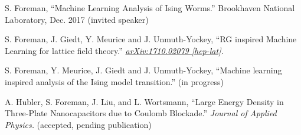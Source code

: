 

\begin{cvparagraph}

    \vspace{2ex}
    \begin{cvitems}
    \item {S. Foreman, ``Machine Learning Analysis of Ising Worms.'' Brookhaven
        National Laboratory, Dec. 2017 (invited speaker)}
    \item {S. Foreman, J. Giedt, Y. Meurice and J. Unmuth-Yockey, ``RG inspired
            Machine Learning for lattice field theory.''
       \textit{\href{https://arxiv.org/abs/1710.02079}{arXiv:1710.02079
   [hep-lat]}.}}
    \item {S. Foreman, Y. Meurice, J. Giedt and J. Unmuth-Yockey, ``Machine
            learning inspired analysis of the Ising model transition.'' (in
           progress)}
    \item {A. Hubler, S. Foreman, J. Liu, and L. Wortsmann, ``Large Energy
            Density in Three-Plate Nanocapacitors due to Coulomb Blockade.''
       \textit{Journal of Applied Physics.} (accepted, pending publication)}
   \end{cvitems}
\end{cvparagraph}


